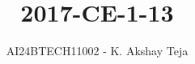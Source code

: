 \documentclass[journal,9pt,onecolumn]{IEEEtran}
\begin{document}

\vspace{3cm}
\title{2017-CE-1-13}
\author{AI24BTECH11002 - K. Akshay Teja}
\maketitle
 \bigskip
{\let\newpage\relax\maketitle}

\renewcommand{\thefigure}{\theenumi}
\renewcommand{\thetable}{\theenumi}
\setlength{\intextsep}{10pt} %

\renewcommand{\thetable}{\theenumi}
\end{document}
